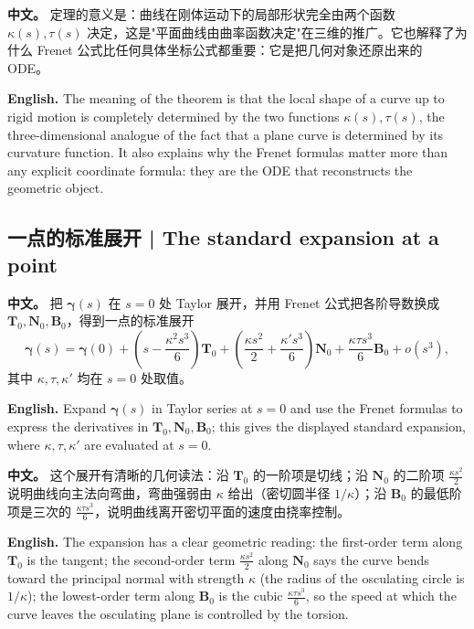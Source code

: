 \documentclass[UTF8,11pt,a4paper]{ctexart}
\newcommand{\APS}[2]{\par\noindent\textbf{中文。} #1\par\noindent\textbf{English.} #2\par\smallskip}
\newcommand{\bT}{\mathbf{T}}
\newcommand{\bN}{\mathbf{N}}
\newcommand{\bB}{\mathbf{B}}
\newcommand{\bgamma}{\boldsymbol{\gamma}}
\begin{document}
\APS{定理的意义是：曲线在刚体运动下的局部形状完全由两个函数 $\kappa(s),\tau(s)$ 决定，这是"平面曲线由曲率函数决定"在三维的推广。它也解释了为什么 Frenet 公式比任何具体坐标公式都重要：它是把几何对象还原出来的 ODE。}{The meaning of the theorem is that the local shape of a curve up to rigid motion is completely determined by the two functions $\kappa(s),\tau(s)$, the three-dimensional analogue of the fact that a plane curve is determined by its curvature function. It also explains why the Frenet formulas matter more than any explicit coordinate formula: they are the ODE that reconstructs the geometric object.}

\subsection{一点的标准展开 | The standard expansion at a point}
\APS{把 $\bgamma(s)$ 在 $s=0$ 处 Taylor 展开，并用 Frenet 公式把各阶导数换成 $\bT_0,\bN_0,\bB_0$，得到一点的标准展开
\[
\bgamma(s)=\bgamma(0)+\left(s-\frac{\kappa^2s^3}{6}\right)\bT_0
+\left(\frac{\kappa s^2}{2}+\frac{\kappa's^3}{6}\right)\bN_0
+\frac{\kappa\tau s^3}{6}\bB_0+o(s^3),
\]
其中 $\kappa,\tau,\kappa'$ 均在 $s=0$ 处取值。}{Expand $\bgamma(s)$ in Taylor series at $s=0$ and use the Frenet formulas to express the derivatives in $\bT_0,\bN_0,\bB_0$; this gives the displayed standard expansion, where $\kappa,\tau,\kappa'$ are evaluated at $s=0$.}
\APS{这个展开有清晰的几何读法：沿 $\bT_0$ 的一阶项是切线；沿 $\bN_0$ 的二阶项 $\frac{\kappa s^2}{2}$ 说明曲线向主法向弯曲，弯曲强弱由 $\kappa$ 给出（密切圆半径 $1/\kappa$）；沿 $\bB_0$ 的最低阶项是三次的 $\frac{\kappa\tau s^3}{6}$，说明曲线离开密切平面的速度由挠率控制。}{The expansion has a clear geometric reading: the first-order term along $\bT_0$ is the tangent; the second-order term $\frac{\kappa s^2}{2}$ along $\bN_0$ says the curve bends toward the principal normal with strength $\kappa$ (the radius of the osculating circle is $1/\kappa$); the lowest-order term along $\bB_0$ is the cubic $\frac{\kappa\tau s^3}{6}$, so the speed at which the curve leaves the osculating plane is controlled by the torsion.}
\end{document}
